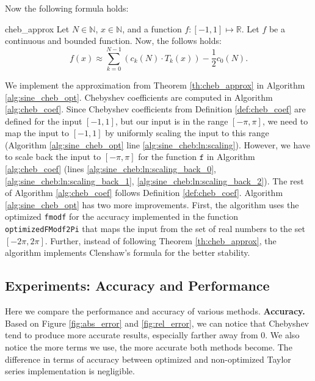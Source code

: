 \documentclass[12pt]{article}
\begin{document}
Now the following formula holds:
\begin{TheoremColor}{}{cheb_approx}
    Let $N \in \mathbb{N}$, $x \in \mathbb{N}$, and a function $f : [-1, 1] \mapsto \mathbb{R}$.
    Let $f$ be a continuous and bounded function. Now, the follows holds:
    \begin{equation*}
        f(x) \approx \sum_{k=0}^{N-1} \left(c_k(N) \cdot T_k(x)\right) - \frac{1}{2} c_0(N).
    \end{equation*}
\end{TheoremColor}

We implement the approximation from Theorem \ref{th:cheb_approx} in Algorithm \ref{alg:sine_cheb_opt}.
Chebyshev coefficients are computed in Algorithm \ref{alg:cheb_coef}.
Since Chebyshev coefficients from Definition \ref{def:cheb_coef} are defined for the input $[-1, 1]$, but our input is in the range $[-\pi, \pi]$, we need to map the input to $[-1, 1]$ by uniformly scaling the input to this range (Algorithm \ref{alg:sine_cheb_opt} line \ref{alg:sine_cheb:ln:scaling}).
However, we have to scale back the input to $[-\pi, \pi]$ for the function $\texttt{f}$ in Algorithm \ref{alg:cheb_coef} (lines \ref{alg:sine_cheb:ln:scaling_back_0}, \ref{alg:sine_cheb:ln:scaling_back_1}, \ref{alg:sine_cheb:ln:scaling_back_2}).
The rest of Algorithm \ref{alg:cheb_coef} follows Definition \ref{def:cheb_coef}.
Algorithm \ref{alg:sine_cheb_opt} has two more improvements.
First, the algorithm uses the optimized \texttt{fmodf} for the accuracy implemented in the function \texttt{optimizedFModf2Pi} that maps the input from the set of real numbers to the set $[-2 \pi, 2 \pi]$.
Further, instead of following Theorem \ref{th:cheb_approx}, the algorithm implements Clenshaw's formula \cite[p~.237]{press2007numerical} for the better stability.


\newpage
\subsection{Experiments: Accuracy and Performance}
Here we compare the performance and accuracy of various methods.
\textbf{Accuracy.}
Based on Figure \ref{fig:abs_error} and \ref{fig:rel_error}, we can notice that Chebyshev tend to produce more accurate results, especially farther away from 0. We also notice the more terms we use, the more accurate both methods become. The difference in terms of accuracy between optimized and non-optimized Taylor series implementation is negligible.
\end{document}
